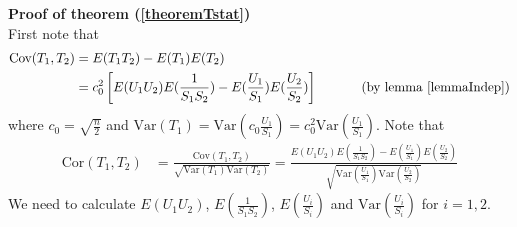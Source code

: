 \documentclass[11pt, a4paper]{article}
\begin{document}
\textbf{Proof of theorem (\ref{theoremTstat})} \\
First note that
\begin{align*}
\text{Cov}(T_1, T_2) &= E(T_1T_2) - E(T_1)E(T_2) \\
& = c_0^2 \left[E(U_1U_2)E(\frac{1}{S_1S_2}) - E(\frac{U_1}{S_1})E( \frac{U_2}{S_2})\right]    ~~~~~~~~~\text{ (by lemma \ref{lemmaIndep})}
\end{align*}
where $c_0 = \sqrt{\frac{n}{2}}$ and $\text{Var}(T_1) = \text{Var}(c_0\frac{U_1}{S_1})= c_0^2\text{Var}(\frac{U_1}{S_1})$. 
Note that 
\begin{align}\label{Tcorrelation}
\text{Cor}(T_1, T_2) & = \frac{\text{Cov}(T_1, T_2) }{\sqrt{\text{Var}(T_1) \text{Var}(T_2) }} = \frac{E(U_1U_2)E(\frac{1}{S_1S_2}) - E(\frac{U_1}{S_1})E( \frac{U_2}{S_2})}{\sqrt{\text{Var}(\frac{U_1}{S_1})\text{Var}(\frac{U_2}{S_2})}} 
\end{align}
We need to calculate $E(U_1U_2)$, $E(\frac{1}{S_1S_2})$, $ E(\frac{U_i}{S_i})$ and $\text{Var}(\frac{U_i}{S_i})$ for $i =1, 2$. 
\end{document}
